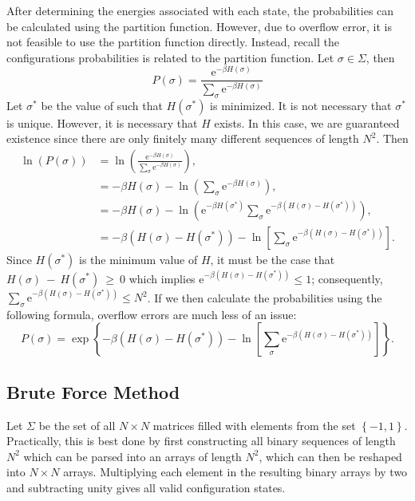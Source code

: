 \documentclass{llncs}
\newcommand{\ee}[1]{\ensuremath{\textrm{e}^{#1}}}
\begin{document}
After determining the energies associated with each state, the probabilities can be calculated using the partition function. However, due to overflow error, it is not feasible to use the partition function directly. Instead, recall the configurations probabilities is related to the partition function. Let $\sigma\in \Sigma$, then 
\begin{equation}
P(\sigma) = \frac{\ee{-\beta H(\sigma)}}{\sum_{\sigma}\ee{-\beta H(\sigma)}}
\end{equation}
Let $\sigma^*$ be the value of such that $H(\sigma^*)$ is minimized. It is not necessary that $\sigma^*$ is unique. However, it is necessary that $H$ exists. In this case, we are guaranteed existence since there are only finitely many different sequences of length $N^2$. Then 
\begin{align}
\ln(P(\sigma)) &= \ln\left(\frac{\ee{-\beta H(\sigma)}}{\sum_{\sigma}\ee{-\beta H(\sigma)}}\right)\nonumber,\\
&= -\beta H(\sigma)-\ln\left(\sum_{\sigma}\ee{-\beta H(\sigma)}\right)\nonumber,\\
&= -\beta H(\sigma)-\ln\left(\ee{-\beta H(\sigma^*)}\sum_{\sigma}\ee{-\beta (H(\sigma)-H(\sigma^*))}\right)\nonumber,\\
&= -\beta (H(\sigma)-H(\sigma^*))-\ln\left[\sum_{\sigma}\ee{-\beta (H(\sigma)-H(\sigma^*))}\right].
\end{align}
Since $H(\sigma^*)$ is the minimum value of $H$, it must be the case that $H(\sigma)~-~H(\sigma^*)~\geq~0$ which implies $\ee{-\beta(H(\sigma)-H(\sigma^*))}\leq 1$; consequently, $\sum_{\sigma}\ee{-\beta (H(\sigma)-H(\sigma^*))}\leq N^2$. If we then calculate the probabilities using the following formula, overflow errors are much less of an issue:
\begin{equation}
P(\sigma) = \exp\left\{-\beta (H(\sigma)-H(\sigma^*))-\ln\left[\sum_{\sigma}\ee{-\beta (H(\sigma)-H(\sigma^*))}\right]\right\}.
\end{equation}

\subsection{Brute Force Method}
Let $\Sigma$ be the set of all $N\times N$ matrices filled with elements from the set $\left\{-1,1\right\}$. Practically, this is best done by first constructing all binary sequences of length $N^2$ which can be parsed into an arrays of length $N^2$, which can then be reshaped into $N\times N$ arrays. Multiplying each element in the resulting binary arrays by two and subtracting unity gives all valid configuration states. 
\end{document}
